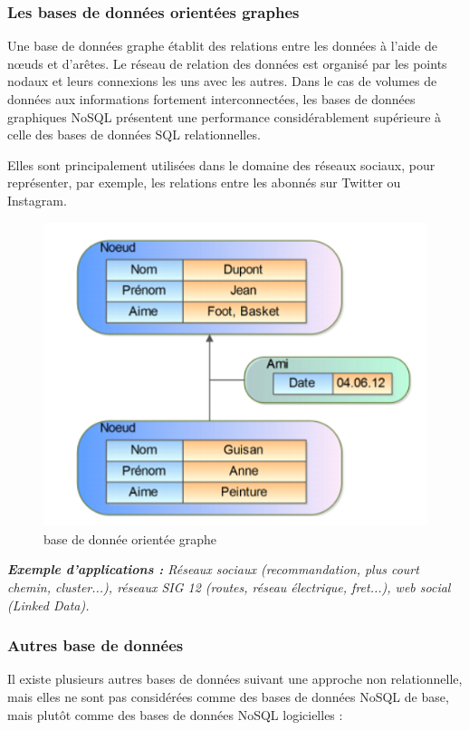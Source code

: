 \subsubsection{Les bases de données orientées graphes}
Une base de données graphe établit des relations entre les données à l'aide de nœuds et d'arêtes. Le réseau de relation des données est organisé par les points nodaux et leurs connexions les uns avec les autres. Dans le cas de volumes de données aux informations fortement interconnectées, les bases de données graphiques NoSQL présentent une performance considérablement supérieure à celle des bases de données SQL relationnelles. 

Elles sont principalement utilisées dans le domaine des réseaux sociaux, pour représenter, par exemple, les relations entre les abonnés sur Twitter ou Instagram.

\begin{figure}[h]
	\centering
    \includegraphics[scale=0.5]{img/4.6}
    \caption{base de donnée orientée graphe}
\end{figure}

\textit{\textbf{Exemple d'applications :} Réseaux sociaux (recommandation, plus court chemin, cluster...), réseaux SIG 12 (routes, réseau électrique, fret...), web social (Linked Data).}

\subsubsection{Autres base de données}
Il existe plusieurs autres bases de données suivant une approche non relationnelle, mais elles ne sont pas considérées comme des bases de données NoSQL de base, mais plutôt comme des bases de données NoSQL logicielles :

